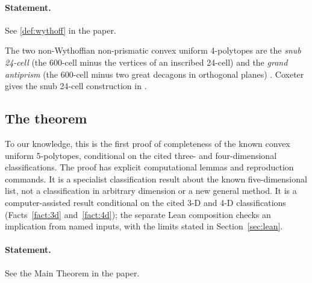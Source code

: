 \documentclass[11pt]{article}
\theoremstyle{definition}
\theoremstyle{remark}
\begin{document}
\paragraph{Statement.} See \ref{def:wythoff} in the paper.


The two non-Wythoffian non-prismatic convex uniform 4-polytopes are the
\emph{snub 24-cell} (the 600-cell minus the vertices of an inscribed
24-cell) and the \emph{grand antiprism} (the 600-cell minus two great
decagons in orthogonal planes) \cite{ConwayGuy1965}. Coxeter gives the snub
24-cell construction in \cite[Section 8.4]{CoxeterRP}.

\subsection{The theorem}

To our knowledge, this is the first proof of completeness of the known
convex uniform 5-polytopes, conditional on the cited three- and
four-dimensional classifications. The proof has explicit computational
lemmas and reproduction commands. It is a specialist classification
result about the known five-dimensional list, not a classification in
arbitrary dimension or a new general method. It is a
computer-assisted result conditional on the cited 3-D and 4-D
classifications (Facts~\ref{fact:3d} and~\ref{fact:4d}); the separate Lean
composition checks an implication from named inputs, with the limits
stated in Section~\ref{sec:lean}.

\paragraph{Statement.} See the Main Theorem in the paper.
\end{document}
